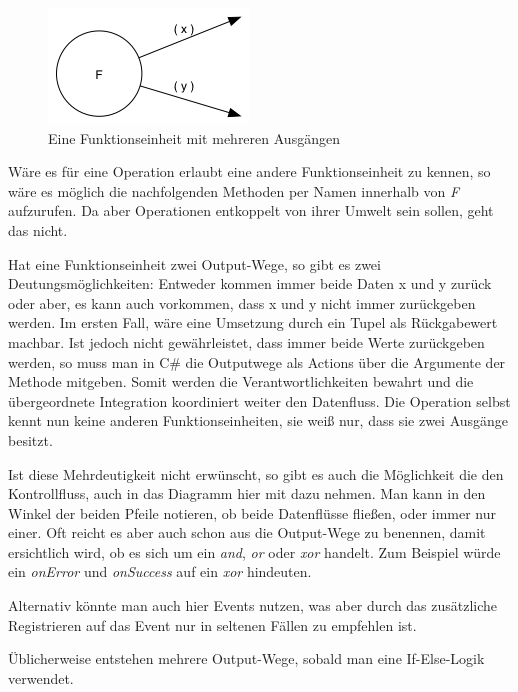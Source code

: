 \begin{figure}[H]
	\centering
	\includegraphics[width=.5\linewidth]{./img/diagramOut2.png}
	\caption{Eine Funktionseinheit mit mehreren Ausgängen}
\end{figure}



Wäre es für eine Operation erlaubt eine andere Funktionseinheit zu kennen, so
wäre es möglich die nachfolgenden Methoden per Namen innerhalb von \emph{F}
aufzurufen. Da aber Operationen entkoppelt von ihrer Umwelt sein sollen, geht das nicht.

Hat eine Funktionseinheit zwei Output-Wege, so gibt es zwei
Deutungsmöglichkeiten: Entweder kommen immer beide Daten x und y zurück oder
aber, es kann auch vorkommen, dass x und y nicht immer zurückgeben werden.
Im ersten Fall, wäre eine Umsetzung durch ein Tupel als Rückgabewert machbar.
Ist jedoch nicht gewährleistet, dass immer beide Werte zurückgeben werden, so
muss man in C\# die Outputwege als Actions über die Argumente der Methode
mitgeben. Somit werden die Verantwortlichkeiten bewahrt und die übergeordnete
Integration koordiniert weiter den Datenfluss. Die Operation selbst kennt nun keine
anderen Funktionseinheiten, sie weiß nur, dass sie zwei Ausgänge besitzt.

Ist diese Mehrdeutigkeit nicht erwünscht, so gibt es auch die Möglichkeit die den Kontrollfluss, auch in das Diagramm hier mit
dazu nehmen. Man kann in den Winkel der beiden Pfeile notieren, ob beide
Datenflüsse fließen, oder immer nur einer. 
Oft reicht es aber auch schon aus die Output-Wege zu benennen, damit ersichtlich
wird, ob es sich um ein \emph{and}, \emph{or} oder \emph{xor} handelt. Zum Beispiel würde ein \emph{onError}
und \emph{onSuccess} auf ein \emph{xor} hindeuten.

Alternativ könnte man auch hier Events nutzen, was aber durch das zusätzliche
Registrieren auf das Event nur in seltenen Fällen zu empfehlen ist.


Üblicherweise entstehen mehrere Output-Wege, sobald man eine
If-Else-Logik verwendet.

\pagebreak

